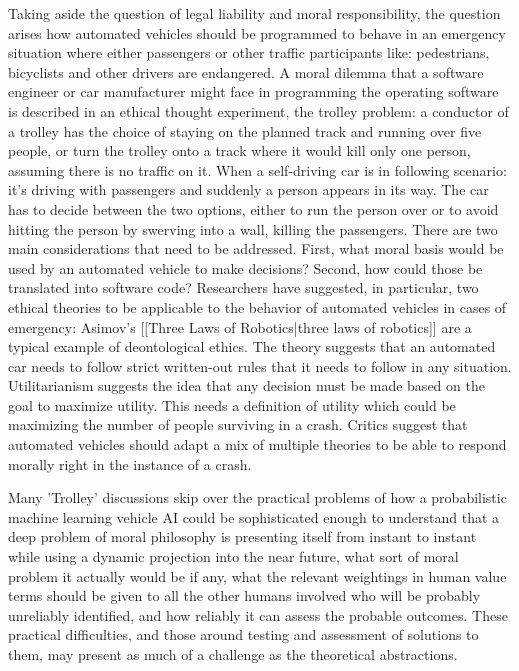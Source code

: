 Taking aside the question of legal liability and moral responsibility, the
question arises how automated vehicles should be programmed to behave in an
emergency situation where either passengers or other traffic participants like:
pedestrians, bicyclists and other drivers are endangered. A moral dilemma that a
software engineer or car manufacturer might face in programming the operating
software is described in an ethical thought experiment, the trolley problem: a
conductor of a trolley has the choice of staying on the planned track and
running over five people, or turn the trolley onto a track where it would kill
only one person, assuming there is no traffic on it. \cite{wiki4} When a
self-driving car is in following scenario: it's driving with passengers and
suddenly a person appears in its way. The car has to decide between the two
options, either to run the person over or to avoid hitting the person by
swerving into a wall, killing the passengers. There are two main considerations that need to be addressed. First, what moral
basis would be used by an automated vehicle to make decisions? Second, how could
those be translated into software code? Researchers have suggested, in
particular, two ethical theories to be applicable to the behavior of automated
vehicles in cases of emergency: Asimov's [[Three Laws of Robotics|three laws of robotics]] are a typical example
of deontological ethics. The theory suggests that an automated car needs to
follow strict written-out rules that it needs to follow in any situation.
Utilitarianism suggests the idea that any decision must be made based on the
goal to maximize utility. This needs a definition of utility which could be
maximizing the number of people surviving in a crash. Critics suggest that
automated vehicles should adapt a mix of multiple theories to be able to respond
morally right in the instance of a crash.\cite{wiki3}

Many 'Trolley' discussions skip over the practical problems of how a
probabilistic machine learning vehicle AI could be sophisticated enough to
understand that a deep problem of moral philosophy is presenting itself from
instant to instant while using a dynamic projection into the near future, what
sort of moral problem it actually would be if any, what the relevant weightings
in human value terms should be given to all the other humans involved who will
be probably unreliably identified, and how reliably it can assess the probable
outcomes. These practical difficulties, and those around testing and assessment
of solutions to them, may present as much of a challenge as the theoretical
abstractions.

